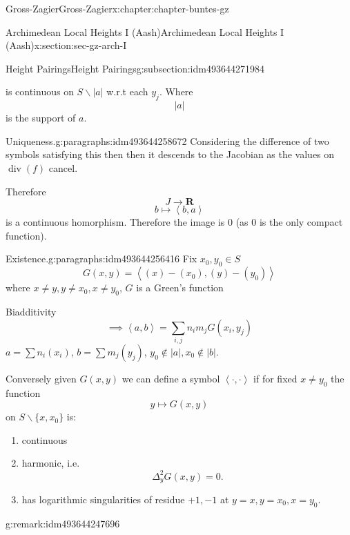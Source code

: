 \documentclass[oneside,10pt,]{book}
\numberwithin{equation}{section}
\newcommand{\pair}[2]{\left\langle #1, #2 \right\rangle}
\newcommand{\RR}{\mathbf{R}}
\DeclareMathOperator{\divisor}{div}
\begin{document}
\begin{chapterptx}{Gross-Zagier}{}{Gross-Zagier}{}{}{x:chapter:chapter-buntes-gz}
\begin{sectionptx}{Archimedean Local Heights I (Aash)}{}{Archimedean Local Heights I (Aash)}{}{}{x:section:sec-gz-arch-I}
\begin{subsectionptx}{Height Pairings}{}{Height Pairings}{}{}{g:subsection:idm493644271984}
\begin{enumerate}
\begin{equation*}
\end{equation*}
is continuous on \(S\smallsetminus |a|\) w.r.t each \(y_j\). Where%
\begin{equation*}
|a|
\end{equation*}
is the support of \(a\).%
\end{enumerate}
%
\begin{paragraphs}{Uniqueness.}{g:paragraphs:idm493644258672}%
Considering the difference of two symbols satisfying this then then it descends to the Jacobian as the values on \(\divisor(f)\) cancel.%
\par
Therefore%
\begin{equation*}
J\to \RR
\end{equation*}
%
\begin{equation*}
b\mapsto \pair b a
\end{equation*}
is a continuous homorphism. Therefore the image is 0 (as 0 is the only compact function).%
\end{paragraphs}%
\begin{paragraphs}{Existence.}{g:paragraphs:idm493644256416}%
Fix \(x_0, y_0 \in S\)%
\begin{equation*}
G(x,y)  = \pair{(x)  - (x_0)}{ (y) - (y_0)}
\end{equation*}
where \(x\ne y,y\ne x_0,x\ne y_0\), \(G\) is a Green's function%
\par
Biadditivity%
\begin{equation*}
\implies \pair ab = \sum_{i,j} n_i m_j G(x_i, y_j)
\end{equation*}
\(a = \sum n_i(x_i)\), \(b = \sum m_j(y_j)\), \(y_0 \not \in |a|,x_0 \not \in |b|\).%
\par
Conversely given \(G(x,y)\) we can define a symbol \(\pair \cdot \cdot\) if for fixed \(x \ne y_0\) the function%
\begin{equation*}
y \mapsto G(x,y)
\end{equation*}
on \(S\smallsetminus\{x,x_0\}\) is:%
\begin{enumerate}
\item{}continuous%
\item{}harmonic, i.e.%
\begin{equation*}
\Delta _y^2 G(x,y) = 0\text{.}
\end{equation*}
%
\item{}has logarithmic singularities of residue \(+1,-1\) at \(y=x,y=x_0, x=y_0\).%
\end{enumerate}
%
\begin{remark}{}{g:remark:idm493644247696}%

\end{remark}
\end{paragraphs}
\end{subsectionptx}
\end{sectionptx}
\end{chapterptx}
\end{document}
